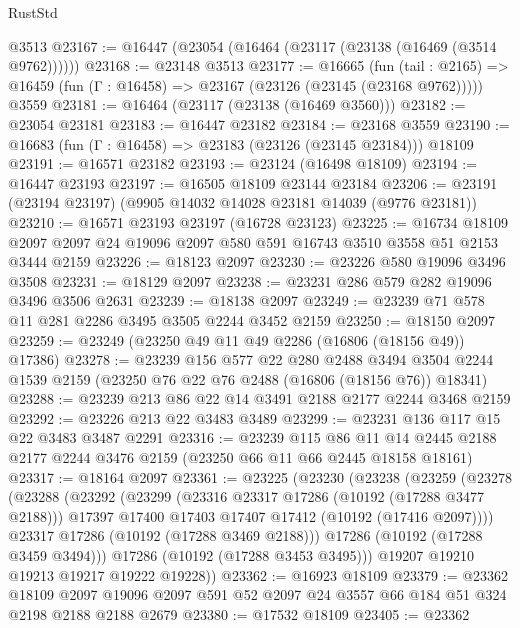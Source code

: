 \begin{lexlean}{RustStd}
\begin{coremodule}
    @3513
@23167 := @16447 (@23054 (@16464 (@23117 (@23138 (@16469 (@3514 @9762))))))
@23168 := @23148 @3513
@23177 := @16665
    (fun (tail : @2165) => @16459 (fun (Γ : @16458) => @23167 (@23126 (@23145 (@23168 @9762)))))
    @3559
@23181 := @16464 (@23117 (@23138 (@16469 @3560)))
@23182 := @23054 @23181
@23183 := @16447 @23182
@23184 := @23168 @3559
@23190 := @16683 (fun (Γ : @16458) => @23183 (@23126 (@23145 @23184))) @18109
@23191 := @16571 @23182
@23193 := @23124 (@16498 @18109)
@23194 := @16447 @23193
@23197 := @16505 @18109 @23144 @23184
@23206 := @23191 (@23194 @23197) (@9905 @14032 @14028 @23181 @14039 (@9776 @23181))
@23210 := @16571 @23193 @23197 (@16728 @23123)
@23225 := @16734
    @18109
    @2097
    @2097
    @24
    @19096
    @2097
    @580
    @591
    @16743
    @3510
    @3558
    @51
    @2153
    @3444
    @2159
@23226 := @18123 @2097
@23230 := @23226 @580 @19096 @3496 @3508
@23231 := @18129 @2097
@23238 := @23231 @286 @579 @282 @19096 @3496 @3506 @2631
@23239 := @18138 @2097
@23249 := @23239 @71 @578 @11 @281 @2286 @3495 @3505 @2244 @3452 @2159
@23250 := @18150 @2097
@23259 := @23249 (@23250 @49 @11 @49 @2286 (@16806 (@18156 @49)) @17386)
@23278 := @23239
    @156
    @577
    @22
    @280
    @2488
    @3494
    @3504
    @2244
    @1539
    @2159
    (@23250 @76 @22 @76 @2488 (@16806 (@18156 @76)) @18341)
@23288 := @23239 @213 @86 @22 @14 @3491 @2188 @2177 @2244 @3468 @2159
@23292 := @23226 @213 @22 @3483 @3489
@23299 := @23231 @136 @117 @15 @22 @3483 @3487 @2291
@23316 := @23239
    @115
    @86
    @11
    @14
    @2445
    @2188
    @2177
    @2244
    @3476
    @2159
    (@23250 @66 @11 @66 @2445 @18158 @18161)
@23317 := @18164 @2097
@23361 := @23225
    (@23230
      (@23238
        (@23259
          (@23278
            (@23288
              (@23292
                (@23299
                  (@23316 @23317 @17286 (@10192 (@17288 @3477 @2188)))
                  @17397
                  @17400
                  @17403
                  @17407
                  @17412
                  (@10192 (@17416 @2097))))
              @23317
              @17286
              (@10192 (@17288 @3469 @2188)))
            @17286
            (@10192 (@17288 @3459 @3494)))
          @17286
          (@10192 (@17288 @3453 @3495)))
        @19207
        @19210
        @19213
        @19217
        @19222
        @19228))
@23362 := @16923 @18109
@23379 := @23362
    @18109
    @2097
    @19096
    @2097
    @591
    @52
    @2097
    @24
    @3557
    @66
    @184
    @51
    @324
    @2198
    @2188
    @2188
    @2679
@23380 := @17532 @18109
@23405 := @23362

\end{coremodule}
\end{lexlean}
